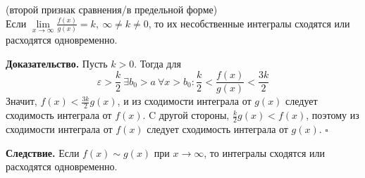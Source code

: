 \begin{theor} (второй признак сравнения/в предельной форме)\\
Если $\lim\limits_{x \to \infty}\frac{f(x)}{g(x)}=k,~\infty\ne k\ne0$, 
то их несобственные интегралы сходятся или расходятся одновременно. 
\end{theor}
\textbf{Доказательство.} Пусть $k>0$. Тогда для
 $$\varepsilon>\frac{k}{2}~\exists b_0>a~\forall x>b_0:\frac{k}{2}<
 \frac{f(x)}{g(x)}<\frac{3k}{2}$$ 
Значит, $f(x)< \frac{3k}{2}g(x)$, и из сходимости интеграла от $g(x)$ следует
сходимость интеграла от $f(x)$. C другой стороны, $\frac{k}{2}g(x)<f(x)$, 
поэтому из сходимости интеграла от $f(x)$ следует сходимость интеграла от 
$g(x)$. $\square$ 

\textbf{Следствие.} Если $f(x)\sim g(x)$ при $x\to \infty$, то интегралы 
сходятся или расходятся одновременно. 

















